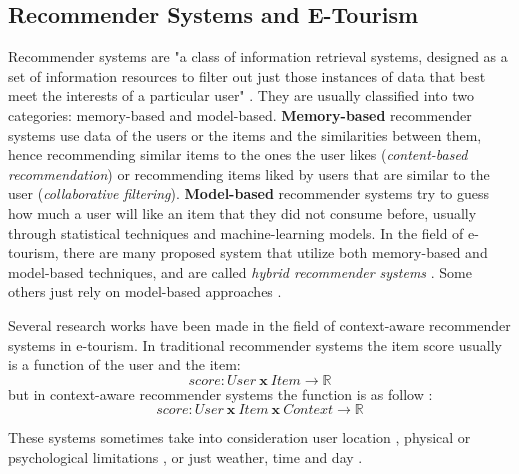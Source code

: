 \subsection{Recommender Systems and E-Tourism}
Recommender systems are "a class of information retrieval systems, designed as a set of information resources to filter out just those instances of data that best meet the interests of a particular user" \cite{artemenko2017tourism}. They are usually classified into two categories: memory-based and model-based. \textbf{Memory-based} recommender systems use data of the users or the items and the similarities between them, hence recommending similar items to the ones the user likes (\textit{content-based recommendation}) or recommending items liked by users that are similar to the user (\textit{collaborative filtering}). \textbf{Model-based} recommender systems try to guess how much a user will like an item that they did not consume before, usually through statistical techniques and machine-learning models. In the field of e-tourism, there are many proposed system that utilize both memory-based and model-based techniques, and are called \textit{hybrid recommender systems} \cite{logesh2019exploring}\cite{logesh2019efficient}. Some others just rely on model-based approaches \cite{sun2019building}.

Several research works have been made in the field of context-aware recommender systems in e-tourism. In traditional recommender systems the item score usually is a function of the user and the item:
\begin{equation}
    score: User \ \mathbf{x} \ Item \rightarrow \mathbb{R}
\end{equation}
but in context-aware recommender systems the function is as follow \cite{artemenko2017tourism}:
\begin{equation}
    score: User \ \mathbf{x} \ Item \ \mathbf{x} \ Context \rightarrow \mathbb{R}
\end{equation}

These systems sometimes take into consideration user location \cite{logesh2018personalised},  physical or psychological limitations \cite{santos2019using}, or just weather, time and day \cite{bahramian_abbaspour_claramunt_2017}.

